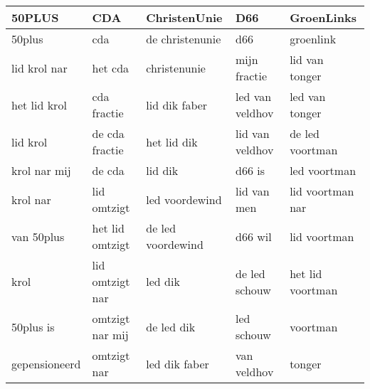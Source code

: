 \begin{tabular}{lllll}
\toprule
        50PLUS &              CDA &       ChristenUnie &              D66 &        GroenLinks \\
\midrule
        50plus &              cda &    de christenunie &              d66 &         groenlink \\
  lid krol nar &          het cda &       christenunie &     mijn fractie &    lid van tonger \\
  het lid krol &      cda fractie &      lid dik faber &  led van veldhov &    led van tonger \\
      lid krol &   de cda fractie &        het lid dik &  lid van veldhov &   de led voortman \\
  krol nar mij &           de cda &            lid dik &           d66 is &      led voortman \\
      krol nar &      lid omtzigt &     led voordewind &      lid van men &  lid voortman nar \\
    van 50plus &  het lid omtzigt &  de led voordewind &          d66 wil &      lid voortman \\
          krol &  lid omtzigt nar &            led dik &    de led schouw &  het lid voortman \\
     50plus is &  omtzigt nar mij &         de led dik &       led schouw &          voortman \\
 gepensioneerd &      omtzigt nar &      led dik faber &      van veldhov &            tonger \\
\bottomrule
\end{tabular}
